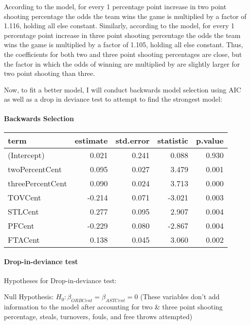 \documentclass[
]{article}
\begin{document}
According to the model, for every 1 percentage point increase in two
point shooting percentage the odds the team wins the game is multiplied
by a factor of 1.116, holding all else constant. Similarly, according to
the model, for every 1 percentage point increase in three point shooting
percentage the odds the team wins the game is multiplied by a factor of
1.105, holding all else constant. Thus, the coefficients for both two
and three point shooting percentages are close, but the factor in which
the odds of winning are multiplied by are slightly larger for two point
shooting than three.

Now, to fit a better model, I will conduct backwards model selection
using AIC as well as a drop in deviance test to attempt to find the
strongest model:

\hypertarget{backwards-selection}{%
\paragraph{Backwards Selection}\label{backwards-selection}}

\begin{longtable}[]{@{}lrrrr@{}}
\toprule
term & estimate & std.error & statistic & p.value \\
\midrule
\endhead
(Intercept) & 0.021 & 0.241 & 0.088 & 0.930 \\
twoPercentCent & 0.095 & 0.027 & 3.479 & 0.001 \\
threePercentCent & 0.090 & 0.024 & 3.713 & 0.000 \\
TOVCent & -0.214 & 0.071 & -3.021 & 0.003 \\
STLCent & 0.277 & 0.095 & 2.907 & 0.004 \\
PFCent & -0.229 & 0.080 & -2.867 & 0.004 \\
FTACent & 0.138 & 0.045 & 3.060 & 0.002 \\
\bottomrule
\end{longtable}

\hypertarget{drop-in-deviance-test}{%
\paragraph{Drop-in-deviance test}\label{drop-in-deviance-test}}

Hypotheses for Drop-in-deviance test:

Null Hypothesis: \(H_0: \beta_{ORBCent} = \beta_{ASTCent} = 0\) (These
variables don't add information to the model after accounting for two \&
three point shooting percentage, steals, turnovers, fouls, and free
throws attempted)
\end{document}
